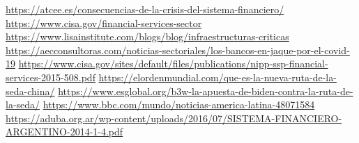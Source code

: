 \documentclass{article}
\begin{document}
\href{https://atcee.es/consecuencias-de-la-crisis-del-sistema-financiero/}{ https://atcee.es/consecuencias-de-la-crisis-del-sistema-financiero/ }
\newline
\newline
\href{https://www.cisa.gov/financial-services-sector}{https://www.cisa.gov/financial-services-sector}
\newline
\newline
\href{https://www.lisainstitute.com/blogs/blog/infraestructuras-criticas}{ https://www.lisainstitute.com/blogs/blog/infraestructuras-criticas }
\newline
\newline
\href{https://aecconsultoras.com/noticias-sectoriales/los-bancos-en-jaque-por-el-covid-19/}{https://aecconsultoras.com/noticias-sectoriales/los-bancos-en-jaque-por-el-covid-19}
\newline
\newline
\href{https://www.cisa.gov/sites/default/files/publications/nipp-ssp-financial-services-2015-508.pdf
}{https://www.cisa.gov/sites/default/files/publications/nipp-ssp-financial-services-2015-508.pdf}
\newline
\newline
\href{https://elordenmundial.com/que-es-la-nueva-ruta-de-la-seda-china/}{https://elordenmundial.com/que-es-la-nueva-ruta-de-la-seda-china/}
\newline
\newline
\href{https://www.esglobal.org/b3w-la-apuesta-de-biden-contra-la-ruta-de-la-seda/}{https://www.esglobal.org/b3w-la-apuesta-de-biden-contra-la-ruta-de-la-seda/}
\newline
\newline
\href{https://www.bbc.com/mundo/noticias-america-latina-48071584}{https://www.bbc.com/mundo/noticias-america-latina-48071584}
\newline
\newline
\href{https://aduba.org.ar/wp-content/uploads/2016/07/SISTEMA-FINANCIERO-ARGENTINO-2014-1-4.pdf}{https://aduba.org.ar/wp-content/uploads/2016/07/SISTEMA-FINANCIERO-ARGENTINO-2014-1-4.pdf}



\printindex
\end{document}
